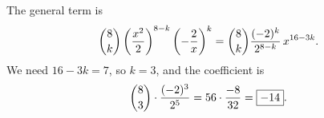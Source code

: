 The general term is
\[\dbinom8k\left(\dfrac{x^2}{2}\right)^{8-k}\left(-\dfrac{2}{x}\right)^k=\dbinom8k\dfrac{(-2)^k}{2^{8-k}}\,x^{16-3k}.\]
We need $16-3k=7$, so $k=3$, and the coefficient is
\[\dbinom83\cdot\dfrac{(-2)^3}{2^5}=56\cdot\dfrac{-8}{32}=\boxed{-14}.\]
